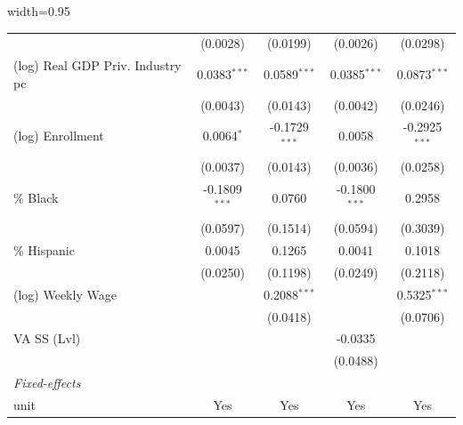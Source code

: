 \documentclass[
  10pt,
]{article}
\begin{document}
\begin{table}[htbp]
\begin{adjustbox}{width=0.95\textheight}
\begin{tabular}{lcccc}
                                                        & (0.0028)            & (0.0199)               & (0.0026)            & (0.0298)\\   
         (log) Real GDP Priv. Industry pc               & 0.0383$^{***}$      & 0.0589$^{***}$         & 0.0385$^{***}$      & 0.0873$^{***}$\\   
                                                        & (0.0043)            & (0.0143)               & (0.0042)            & (0.0246)\\   
         (log) Enrollment                               & 0.0064$^{*}$        & -0.1729$^{***}$        & 0.0058              & -0.2925$^{***}$\\   
                                                        & (0.0037)            & (0.0143)               & (0.0036)            & (0.0258)\\   
         \% Black                                       & -0.1809$^{***}$     & 0.0760                 & -0.1800$^{***}$     & 0.2958\\   
                                                        & (0.0597)            & (0.1514)               & (0.0594)            & (0.3039)\\   
         \% Hispanic                                    & 0.0045              & 0.1265                 & 0.0041              & 0.1018\\   
                                                        & (0.0250)            & (0.1198)               & (0.0249)            & (0.2118)\\   
         (log) Weekly Wage                              &                     & 0.2088$^{***}$         &                     & 0.5325$^{***}$\\   
                                                        &                     & (0.0418)               &                     & (0.0706)\\   
         VA SS (Lvl)                                    &                     &                        & -0.0335             &   \\   
                                                        &                     &                        & (0.0488)            &   \\   
         \midrule
         \emph{Fixed-effects}\\
         unit                                           & Yes                 & Yes                    & Yes                 & Yes\\  

\end{tabular}
\end{adjustbox}
\end{table}
\end{document}
